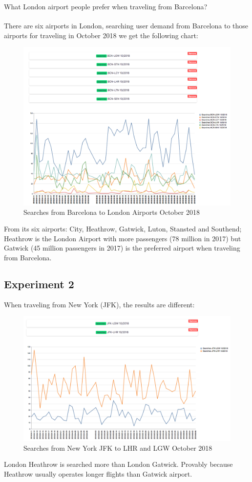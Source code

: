 What London airport people prefer when traveling from Barcelona?
\\\\
There are six airports in London, searching user demand from Barcelona to those airports for traveling in October 2018 we get the following chart:

\begin{figure}[H]
\centering
\includegraphics[scale=0.3]{resources/experiment01.png}
\caption{Searches from Barcelona to London Airports October 2018}
\end{figure}

From its six airports: City, Heathrow, Gatwick, Luton, Stansted and Southend; Heathrow is the London Airport with more passengers (78 million in 2017\cite{london_traffic}) but Gatwick (45 million passengers in 2017) is the preferred airport when traveling from Barcelona.

\subsection*{Experiment 2} \label{exp2}

When traveling from New York (JFK), the results are different:

\begin{figure}[H]
\centering
\includegraphics[scale=0.35]{resources/experiment02.png}
\caption{Searches from New York JFK to LHR and LGW October 2018}
\end{figure}

London Heathrow is searched more than London Gatwick. Provably because Heathrow usually operates longer flights than Gatwick airport.

